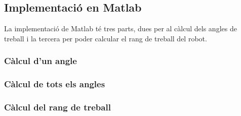 \clearpage
\subsection{Implementació en Matlab}

La implementació de Matlab té tres parts, dues per al càlcul dels angles de treball i la tercera per poder calcular el rang de treball del robot.

\subsubsection{Càlcul d'un angle}


\newpage
\subsubsection{Càlcul de tots els angles}


\newpage
\subsubsection{Càlcul del rang de treball}


